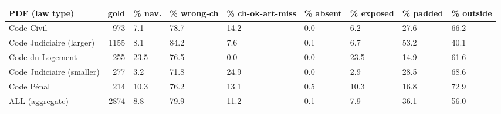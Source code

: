\begin{tabular}{lrlllllll}
\toprule
PDF (law type) & gold & \% nav. & \% wrong-ch & \% ch-ok-art-miss & \% absent & \% exposed & \% padded & \% outside \\
\midrule
Code Civil & 973 & 7.1 & 78.7 & 14.2 & 0.0 & 6.2 & 27.6 & 66.2 \\
Code Judiciaire (larger) & 1155 & 8.1 & 84.2 & 7.6 & 0.1 & 6.7 & 53.2 & 40.1 \\
Code du Logement & 255 & 23.5 & 76.5 & 0.0 & 0.0 & 23.5 & 14.9 & 61.6 \\
Code Judiciaire (smaller) & 277 & 3.2 & 71.8 & 24.9 & 0.0 & 2.9 & 28.5 & 68.6 \\
Code Pénal & 214 & 10.3 & 76.2 & 13.1 & 0.5 & 10.3 & 16.8 & 72.9 \\
ALL (aggregate) & 2874 & 8.8 & 79.9 & 11.2 & 0.1 & 7.9 & 36.1 & 56.0 \\
\bottomrule
\end{tabular}
